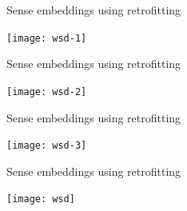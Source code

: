 \begin{frame}{Sense embeddings using retrofitting}
\vspace{-3em}
\begin{center}
\texttt{[image: wsd-1]}
\end{center}	
\end{frame}



\begin{frame}{Sense embeddings using retrofitting}
\vspace{-3em}
\begin{center}
\texttt{[image: wsd-2]}
\end{center}	
\end{frame}



\begin{frame}{Sense embeddings using retrofitting}
\vspace{-3em}
\begin{center}
\texttt{[image: wsd-3]}
\end{center}	
\end{frame}



	
\begin{frame}{Sense embeddings using retrofitting}
\vspace{-3em}
	\begin{center}
		\texttt{[image: wsd]}
	\end{center}
	
\end{frame}






